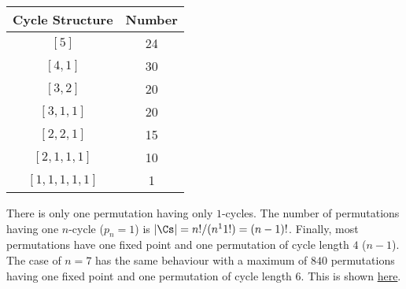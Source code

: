 \begin{tabular}{cc}
    Cycle Structure & Number \\ \hline
    $[5]$ &  24 \\
    $[4, 1]$ & 30 \\
    $[3, 2]$ & 20 \\
    $[3, 1, 1]$ & 20 \\
    $[2, 2, 1]$ & 15 \\
    $[2, 1, 1, 1]$ & 10 \\
    $[1, 1, 1, 1, 1]$ & 1
\end{tabular}

\vspace{2mm}

There is only one permutation having only $1$-cycles. The number of permutations having one $n$-cycle ($p_n=1$) is $|\Cs| = n!/(n^1 1!) = (n-1)!$. Finally, most permutations have one fixed point and one permutation of cycle length $4$ ($n-1$). The case of $n=7$ has the same behaviour with a maximum of $840$ permutations having one fixed point and one permutation of cycle length $6$. This is shown \href{https://math.ucr.edu/home/baez/permutations/permutations_1.html}{here}.

